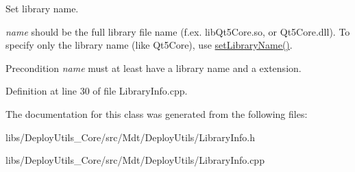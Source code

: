 Set library name. 

{\itshape name} should be the full library file name (f.\+ex. lib\+Qt5\+Core.\+so, or Qt5\+Core.\+dll). To specify only the library name (like Qt5\+Core), use \hyperlink{class_mdt_1_1_deploy_utils_1_1_library_info_acd5102f7ca77e51efde466342b27f0ce}{set\+Library\+Name()}.

\begin{DoxyPrecond}{Precondition}
{\itshape name} must at least have a library name and a extension. 
\end{DoxyPrecond}


Definition at line 30 of file Library\+Info.\+cpp.



The documentation for this class was generated from the following files\+:\begin{DoxyCompactItemize}
\item 
libs/\+Deploy\+Utils\+\_\+\+Core/src/\+Mdt/\+Deploy\+Utils/Library\+Info.\+h\item 
libs/\+Deploy\+Utils\+\_\+\+Core/src/\+Mdt/\+Deploy\+Utils/Library\+Info.\+cpp\end{DoxyCompactItemize}

